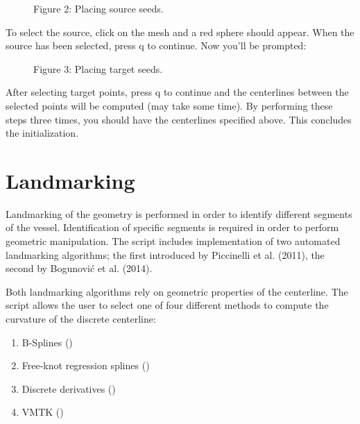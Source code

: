 \documentclass[letterpaper,10pt,english]{sphinxmanual}
\begin{document}
\begin{figure}[htbp]
\centering
\capstart

\noindent{}
\caption{Figure 2: Placing source seeds.}\label{\detokenize{getting_started:id2}}\end{figure}

To select the source, click on the mesh and a red sphere should appear.
When the source has been selected, press q to continue. Now you’ll be prompted:

%
\begin{sphinxVerbatim}[commandchars=\\\{\}]
             
\end{sphinxVerbatim}

\begin{figure}[htbp]
\centering
\capstart

\noindent{}
\caption{Figure 3: Placing target seeds.}\label{\detokenize{getting_started:id3}}\end{figure}

After selecting target points, press q to continue and the centerlines between the selected points will be computed (may take some time).
By performing these steps three times, you should have the centerlines specified above.
This concludes the initialization.


\section{Landmarking}
\label{\detokenize{getting_started:landmarking}}
Landmarking of the geometry is performed in order to identify different segments of the vessel.
Identification of specific segments is required in order to perform geometric manipulation.
The script  includes implementation of two automated landmarking algorithms; the first introduced by Piccinelli et al. (2011), the second by Bogunović et al. (2014).

Both landmarking algorithms rely on geometric properties of the centerline.
The script allows the user to select one of four different methods to compute the curvature of the discrete centerline:
\begin{enumerate}
\item {} 
B-Splines ()

\item {} 
Free-knot regression splines ()

\item {} 
Discrete derivatives ()

\item {} 
VMTK ()

\end{enumerate}
\end{document}
